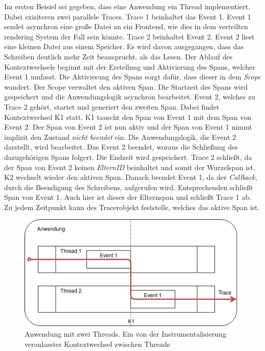 Im ersten Beisiel sei gegeben, dass eine Anwendung ein Thread implementiert. Dabei exisiteren zwei parallele Traces. Trace 1 beinhaltet das Event 1. Event 1 sendet asynchron eine große Datei an ein Frontend, wie dies in dem verteilten rendering System der Fall sein könnte.  Trace 2 beinhaltet Event 2. Event 2 liest eine kleinen Datei aus einem Speicher. Es wird davon ausgegangen, dass das Schreiben deutlich mehr Zeit beansprucht, als das Lesen. Der Ablauf des Kontextwechsels beginnt mit der Erstellnug und Aktivierung des Spans, welcher Event 1 umfasst. Die Aktivierung des Spans sorgt dafür, dass dieser in dem \emph{Scope} wandert. Der Scope verwaltet den aktiven Span. Die Startzeit des Spans wird gespeichert und die Anwendungslogik asynchron bearbeitet. Event 2, welches zu Trace 2 gehört, startet und generiert den zweiten Span. Dabei findet Kontextwechsel K1 statt. K1 tauscht den Span von Event 1 mit dem Span von Event 2. Der Span von Event 2 ist nun aktiv und der Span von Event 1 nimmt implizit den Zustand \emph{nicht beendet} ein. Die Anwendungslogik, die Event 2 darstellt, wird bearbeitet. Das Event 2 beendet, woraus die Schließung des dazugehörigen Spans folgert. Die Endzeit wird gespeichert. Trace 2 schließt, da der Span von Event 2 keinen \emph{ElternID} beinhaltet und somit der Wurzelspan ist. K2 wechselt wieder den aktiven Span. Danach beendet Event 1, da der \emph{Callback}, durch die Beendigung des Schreibens, aufgerufen wird. Entsprechenden schließt Span von Event 1. Auch hier ist dieser der Elternspan und schließt Trace 1 ab. Zu jedem Zeitpunkt kann des Tracerobjekt feststelle, welches das aktive Span ist.


\begin{figure}[!ht]
	\centering
	\includegraphics[scale=0.5]{img/Design/SpanMultipleThreadKontext.png}
	\caption[Tracingkontexts über mehrere Threads innerhalb einer Anwendung]{Anwendung mit zwei Threads. Ein von der Instrumentalisierung veranlasster Kontextwechsel zwischen Threads}
	\label{fig:SpanMultipleThreadKontext}
\end{figure}

